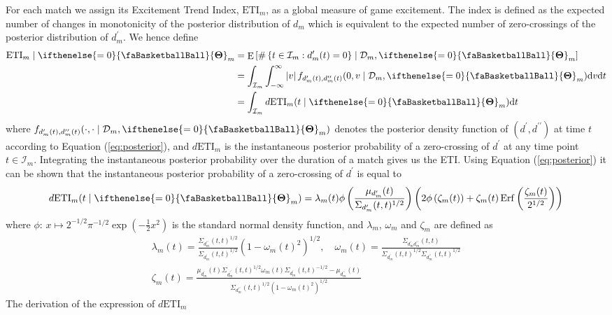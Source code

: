 \documentclass[
  11pt,
]{svjour3}
\theoremstyle{nonumberplain}
\begin{document}
For each match we assign its Excitement Trend Index, \(\text{ETI}_m\),
as a global measure of game excitement. The index is defined as the
expected number of changes in monotonicity of the posterior distribution
of \(d_m\) which is equivalent to the expected number of zero-crossings
of the posterior distribution of \(d^\prime_m\). We hence define
\begin{align}
\begin{split}
  \text{ETI}_m \mid \ifthenelse{\value{bbsym4theta}=0}{\text{\faBasketballBall}}{\mathbf{\Theta}}_m &= \mathop{\mathrm{E}}\left[\#\left\{t \in \mathcal{I}_m : d^\prime_m(t) = 0\right\} \mid \mathcal{D}_m, \ifthenelse{\value{bbsym4theta}=0}{\text{\faBasketballBall}}{\mathbf{\Theta}}_m\right]\\
  &= \int_{\mathcal{I}_m} \int_{-\infty}^\infty \left|v\right| f_{d^\prime_m(t), d^{\prime\prime}_m(t)}(0, v \mid \mathcal{D}_m, \ifthenelse{\value{bbsym4theta}=0}{\text{\faBasketballBall}}{\mathbf{\Theta}}_m)\textrm{d}v\textrm{d}t \\
  &= \int_{\mathcal{I}_m} d\mathrm{ETI}_m(t \mid \ifthenelse{\value{bbsym4theta}=0}{\text{\faBasketballBall}}{\mathbf{\Theta}}_m)\mathrm{d}t
\end{split}
\label{eq:ETIdef}
\end{align} where
\(f_{d^\prime_m(t), d^{\prime\prime}_m(t)}(\cdot, \cdot \mid \mathcal{D}_m, \ifthenelse{\value{bbsym4theta}=0}{\text{\faBasketballBall}}{\mathbf{\Theta}}_m)\)
denotes the posterior density function of
\((d^\prime, d^{\prime\prime})\) at time \(t\) according to Equation
(\ref{eq:posterior}), and \(d\mathrm{ETI}_m\) is the instantaneous
posterior probability of a zero-crossing of \(d^\prime\) at any time
point \(t \in \mathcal{I}_m\). Integrating the instantaneous posterior
probability over the duration of a match gives us the ETI. Using
Equation (\ref{eq:posterior}) it can be shown that the instantaneous
posterior probability of a zero-crossing of \(d^\prime\) is equal to
\begin{align*}
d\mathrm{ETI}_m(t \mid \ifthenelse{\value{bbsym4theta}=0}{\text{\faBasketballBall}}{\mathbf{\Theta}}_m) = \lambda_m(t)\phi\left(\frac{\mu_{d_m^\prime}(t)}{\Sigma_{d_m^\prime}(t,t)^{1/2}}\right)\left(2\phi\left(\zeta_m(t)\right) + \zeta_m(t)\mathop{\mathrm{Erf}}\left(\frac{\zeta_m(t)}{2^{1/2}}\right)\right)
\end{align*} where
\(\phi\colon\, x \mapsto 2^{-1/2}\pi^{-1/2}\exp(-\frac{1}{2}x^2)\) is
the standard normal density function, and \(\lambda_m\), \(\omega_m\)
and \(\zeta_m\) are defined as \begin{gather*}
  \lambda_m(t) = \frac{\Sigma_{d_m^{\prime\prime}}(t,t)^{1/2}}{\Sigma_{d_m^\prime}(t,t)^{1/2}}\left(1-\omega_m(t)^2\right)^{1/2}, \quad \omega_m(t) = \frac{\Sigma_{d_m^\prime d_m^{\prime\prime}}(t,t)}{\Sigma_{d_m^\prime}(t,t)^{1/2}\Sigma_{d_m^{\prime\prime}}(t,t)^{1/2}}\\
  \zeta_m(t) = \frac{\mu_{d_m^\prime}(t)\Sigma_{d_m^{\prime^\prime}}(t,t)^{1/2}\omega_m(t)\Sigma_{d_m^\prime}(t,t)^{-1/2} - \mu_{d_m^{\prime\prime}}(t)}{\Sigma_{d_m^{\prime\prime}}(t,t)^{1/2}\left(1 - \omega_m(t)^2\right)^{1/2}}
\end{gather*} The derivation of the expression of \(d\mathrm{ETI}_m\)
\end{document}
